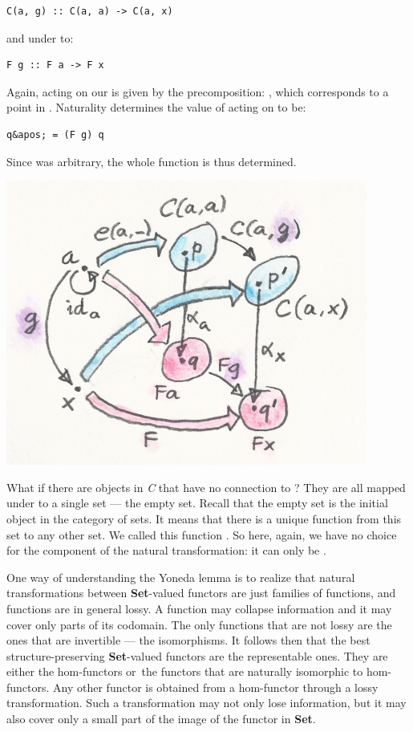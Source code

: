 \begin{verbatim}
C(a, g) :: C(a, a) -> C(a, x)
\end{verbatim}

and under  to:

\begin{verbatim}
F g :: F a -> F x
\end{verbatim}

Again,  acting on our  is given by the
precomposition: , which corresponds to a point
 in . Naturality determines the value
of  acting on  to be:

\begin{verbatim}
q&apos; = (F g) q
\end{verbatim}

Since  was arbitrary, the whole function  is
thus determined.

\includegraphics{images/yoneda5.png}

What if there are objects in \emph{C} that have no connection to
? They are all mapped under  to a single set
--- the empty set. Recall that the empty set is the initial object in
the category of sets. It means that there is a unique function from this
set to any other set. We called this function . So here,
again, we have no choice for the component of the natural
transformation: it can only be .

One way of understanding the Yoneda lemma is to realize that natural
transformations between \textbf{Set}-valued functors are just families
of functions, and functions are in general lossy. A function may
collapse information and it may cover only parts of its codomain. The
only functions that are not lossy are the ones that are invertible ---
the isomorphisms. It follows then that the best structure-preserving
\textbf{Set}-valued functors are the representable ones. They are either
the hom-functors or~the functors that are naturally isomorphic to
hom-functors. Any other functor  is obtained from a
hom-functor through a lossy transformation. Such a transformation may
not only lose information, but it may also cover only a small part of
the image of the functor  in \textbf{Set}.

